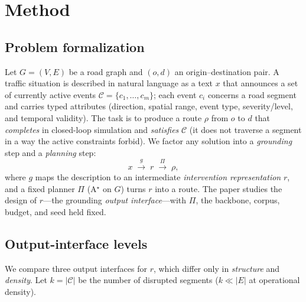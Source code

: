 \section{Method}
\label{sec:method}

\subsection{Problem formalization}
Let $G=(V,E)$ be a road graph and $(o,d)$ an origin--destination pair. A traffic situation is described
in natural language as a text $x$ that announces a set of currently active events
$\mathcal{C}=\{c_1,\dots,c_m\}$; each event $c_i$ concerns a road segment and carries typed attributes
(direction, spatial range, event type, severity/level, and temporal validity). The task is to produce a
route $\rho$ from $o$ to $d$ that \emph{completes} in closed-loop simulation and \emph{satisfies}
$\mathcal{C}$ (it does not traverse a segment in a way the active constraints forbid). We factor any
solution into a \emph{grounding} step and a \emph{planning} step:
\[
  x \;\xrightarrow{\;g\;}\; r \;\xrightarrow{\;\Pi\;}\; \rho ,
\]
where $g$ maps the description to an intermediate \emph{intervention representation} $r$, and a fixed
planner $\Pi$ (A$^\star$ on $G$) turns $r$ into a route. The paper studies the design of $r$---the
grounding \emph{output interface}---with $\Pi$, the backbone, corpus, budget, and seed held fixed.

\subsection{Output-interface levels}
We compare three output interfaces for $r$, which differ only in \emph{structure} and \emph{density}.
Let $k=|\mathcal{C}|$ be the number of disrupted segments ($k\ll|E|$ at operational density).

